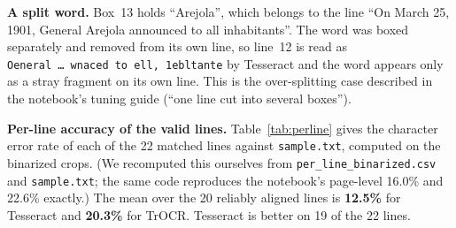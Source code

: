 \documentclass[10pt,twocolumn]{article}
\newcommand{\sample}{\texttt{sample.txt}}
\begin{document}
\textbf{A split word.} Box~13 holds ``Arejola'', which belongs to the line ``On March 25, 1901, General Arejola announced to all inhabitants''. The word was boxed separately and removed from its own line, so line~12 is read as \texttt{Oeneral~\ldots~wnaced~to~ell,~1ebltante} by Tesseract and the word appears only as a stray fragment on its own line. This is the over-splitting case described in the notebook's tuning guide (``one line cut into several boxes'').

\textbf{Per-line accuracy of the valid lines.} Table~\ref{tab:perline} gives the character error rate of each of the 22 matched lines against \sample{}, computed on the binarized crops. (We recomputed this ourselves from \texttt{per\_\allowbreak{}line\_\allowbreak{}binarized.csv} and \sample{}; the same code reproduces the notebook's page-level 16.0\% and 22.6\% exactly.) The mean over the 20 reliably aligned lines is \textbf{12.5\%} for Tesseract and \textbf{20.3\%} for TrOCR. Tesseract is better on 19 of the 22 lines.
\end{document}
